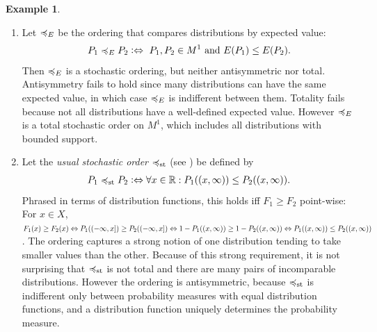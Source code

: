 \documentclass[a4paper,DIV=11,abstracton,twoside=semi]{scrreprt}
\newcommand{\M}{M}
\theoremstyle{definition}
\newtheorem{ex}[thm]{Example} %
\begin{document}
    \begin{ex}~
        \label{ex:stochasticOrdersLeqELeqst}
        \begin{enumerate}
            \item 
            Let $\preccurlyeq_E$ be the ordering that compares distributions by expected value:
            \begin{gather*}
                P_1 \leqE P_2 \colonlra \text{ $P_1, P_2 \in \M^1$ and $E(P_1) \leq E(P_2)$}.
            \end{gather*}
            Then $\preccurlyeq_E$ is a stochastic ordering, but neither antisymmetric nor total. Antisymmetry fails to hold since many distributions can have the same expected value, in which case $\preccurlyeq_E$ is indifferent between them. Totality fails because not all distributions have a well-defined expected value. However $\preccurlyeq_E$ is a total stochastic order on $\M^1$, which includes all distributions with bounded support.
            
            \item Let the \emph{usual stochastic order} $\preccurlyeq_{\text{st}}$ (see \cite{bib:shakedStochasticOrders}) be defined by 
            \begin{gather*}
                P_1 \preccurlyeq_{\text{st}} P_2 \mathrel{\vcentcolon\Leftrightarrow} \forall x \in \mathbb{R}: P_1((x, \infty)) \leq P_2((x, \infty)).
            \end{gather*}
            Phrased in terms of distribution functions, this holds iff $F_1 \geq F_2$ point-wise: For $x \in X$, $F_1(x) \geq F_2(x) \Leftrightarrow P_1((-\infty, x]) \geq P_2((-\infty, x]) \Leftrightarrow 1 - P_1((x, \infty)) \geq 1 - P_2((x, \infty)) \Leftrightarrow P_1((x, \infty)) \leq P_2((x, \infty))$. The ordering captures a strong notion of one distribution tending to take smaller values than the other. Because of this strong requirement, it is not surprising that $\preccurlyeq_{\text{st}}$ is not total and there are many pairs of incomparable distributions. However the ordering is antisymmetric, because $\preccurlyeq_{\text{st}}$ is indifferent only between probability measures with equal distribution functions, and a distribution function uniquely determines the probability measure.
        \end{enumerate}
    \end{ex}

    \let\dpref\dgeq
    \let\dnonpref\dleq
    \let\dstrpref\dgreater
    \let\dstrnonpref\dless
    
\end{document}
